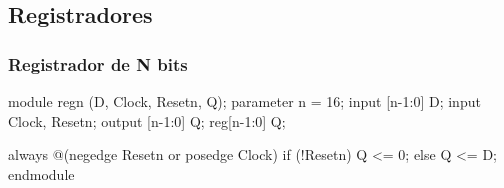 
\subsection{Registradores}

\begin{frame}[fragile]
	\frametitle{Registrador de N bits}
	\begin{verilogcode}
module regn (D, Clock, Resetn, Q); 
  parameter n = 16;
  input [n-1:0] D;
  input Clock, Resetn;
  output [n-1:0] Q; 
  reg[n-1:0] Q;

  always @(negedge Resetn or posedge Clock) 
    if (!Resetn)
      Q <= 0; 
    else
      Q <= D; 
endmodule
	\end{verilogcode}
\end{frame}

